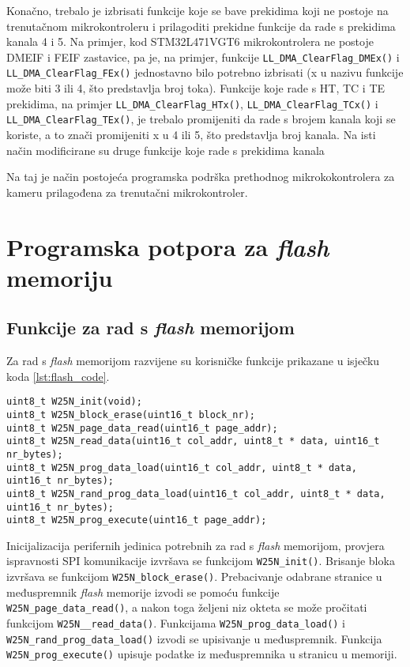 Konačno, trebalo je izbrisati funkcije koje se bave prekidima koji ne postoje na trenutačnom mikrokontroleru i prilagoditi prekidne funkcije da rade s prekidima kanala 4 i 5. Na primjer, kod STM32L471VGT6 mikrokontrolera ne postoje DMEIF i FEIF zastavice, pa je, na primjer, funkcije \verb|LL_DMA_ClearFlag_DMEx()| i \\ \verb|LL_DMA_ClearFlag_FEx()| jednostavno bilo potrebno izbrisati (x u nazivu funkcije može biti 3 ili 4, što predstavlja broj toka). Funkcije koje rade s HT, TC i TE prekidima, na primjer \verb|LL_DMA_ClearFlag_HTx()|, \verb|LL_DMA_ClearFlag_TCx()| i \\ \verb|LL_DMA_ClearFlag_TEx()|, je trebalo promijeniti da rade s brojem kanala koji se koriste, a to znači promijeniti x u 4 ili 5, što predstavlja broj kanala. Na isti način modificirane su druge funkcije koje rade s prekidima kanala

Na taj je način postojeća programska podrška prethodnog mikrokokontrolera za kameru prilagođena za trenutačni mikrokontroler.

\section{Programska potpora za \textit{flash} memoriju}

\subsection{Funkcije za rad s \textit{flash} memorijom}

Za rad s \textit{flash} memorijom razvijene su korisničke funkcije prikazane u isječku koda \ref{lst:flash_code}.

\begin{lstlisting}[caption=Korisničke funkcije za \textit{flash} memoriju, label={lst:flash_code}]
uint8_t W25N_init(void);
uint8_t W25N_block_erase(uint16_t block_nr);
uint8_t W25N_page_data_read(uint16_t page_addr);
uint8_t W25N_read_data(uint16_t col_addr, uint8_t * data, uint16_t nr_bytes);
uint8_t W25N_prog_data_load(uint16_t col_addr, uint8_t * data, uint16_t nr_bytes);
uint8_t W25N_rand_prog_data_load(uint16_t col_addr, uint8_t * data, uint16_t nr_bytes);
uint8_t W25N_prog_execute(uint16_t page_addr);
\end{lstlisting}

\noindent Inicijalizacija perifernih jedinica potrebnih za rad s \textit{flash} memorijom, provjera ispravnosti SPI komunikacije izvršava se funkcijom \verb|W25N_init()|. Brisanje bloka izvršava se funkcijom \verb|W25N_block_erase()|. Prebacivanje odabrane stranice u međuspremnik \textit{flash} memorije izvodi se pomoću funkcije \verb|W25N_page_data_read()|, a nakon toga željeni niz okteta se može pročitati funkcijom \verb|W25N__read_data()|. Funkcijama \verb|W25N_prog_data_load()| i \verb|W25N_rand_prog_data_load()| izvodi se upisivanje u međuspremnik. Funkcija \verb|W25N_prog_execute()| upisuje podatke iz međuspremnika u stranicu u memoriji.

